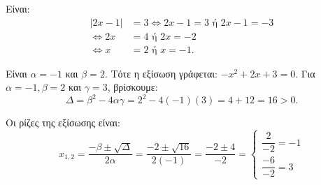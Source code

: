
\begin{alist}
\item Είναι:
\begin{align*}
|2x - 1| &= 3 \Leftrightarrow 2x - 1 = 3 \text{ ή } 2x - 1 = -3 \\
\Leftrightarrow 2x &= 4 \text{ ή } 2x = -2 \\
\Leftrightarrow x &= 2 \text{ ή } x = -1.
\end{align*}

\item Είναι $\alpha = -1$ και $\beta = 2$. Τότε η εξίσωση γράφεται:
$-x^2 + 2x + 3 = 0$.
Για $\alpha = -1, \beta = 2$ και $\gamma = 3$, βρίσκουμε:
\[\Delta = \beta^2 - 4\alpha\gamma = 2^2 - 4(-1)(3) = 4 + 12 = 16 > 0.\]

Οι ρίζες της εξίσωσης είναι:
\[x_{1,2} = \dfrac{-\beta \pm \sqrt{\Delta}}{2\alpha} = \dfrac{-2 \pm \sqrt{16}}{2(-1)} = \dfrac{-2 \pm 4}{-2} = \begin{cases} \dfrac{2}{-2} = -1 \\ \dfrac{-6}{-2} = 3 \end{cases}\]
\end{alist}

